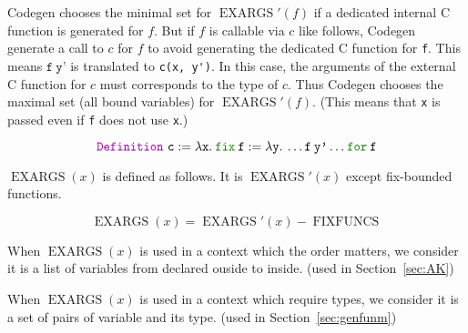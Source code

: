 \documentclass[a4paper,fleqn]{article}
\def\codegen{\textrm{Codegen}}
\newcommand{\kwDefinition}{\mbox{\color{myviolet}\ttfamily Definition}}
\newcommand{\kwfix}{\mbox{\color{mygreen}\ttfamily fix}}
\newcommand{\kwfor}{\mbox{\color{mygreen}\ttfamily for}}
\newcommand{\lam}[2]{\lambda #1.\:#2}
\newcommand{\ofix}[2]{\kwfix\:{#1}\:\kwfor\:{#2}}
\DeclareMathOperator{\FIXFUNCS}{FIXFUNCS}
\DeclareMathOperator{\EXARGS}{EXARGS}
\newcommand{\secref}[1]{Section~\ref{#1}}
\begin{document}
\codegen{} chooses the minimal set for $\EXARGS'(f)$ if a dedicated internal C function is generated for $f$.
But if $f$ is callable via $c$ like follows, \codegen{} generate a call to $c$ for $f$
to avoid generating the dedicated C function for \texttt{f}.
This means $\texttt{f}\:\texttt{y'}$ is translated to \lstinline[style=Cstyle]!c(x, y')!.
In this case, the arguments of the external C function for $c$ must corresponds to the type of $c$.
Thus \codegen{} chooses the maximal set (all bound variables) for $\EXARGS'(f)$.
(This means that \texttt{x} is passed even if \texttt{f} does not use \texttt{x}.)

\[
  \kwDefinition~\texttt{c} := \lam{\texttt{x}}{\ofix{\texttt{f}:=\lam{\texttt{y}}{\ldots \texttt{f}\:\texttt{y'} \ldots}}{\texttt{f}}}
\]

$\EXARGS(x)$ is defined as follows.
It is $\EXARGS'(x)$ except fix-bounded functions.

\[
  \EXARGS(x) = \EXARGS'(x) - \FIXFUNCS
\]

When $\EXARGS(x)$ is used in a context which the order matters,
we consider it is a list of variables from declared ouside to inside.
(used in \secref{sec:AK})

When $\EXARGS(x)$ is used in a context which require types,
we consider it is a set of pairs of variable and its type.
(used in \secref{sec:genfunm})
\end{document}
